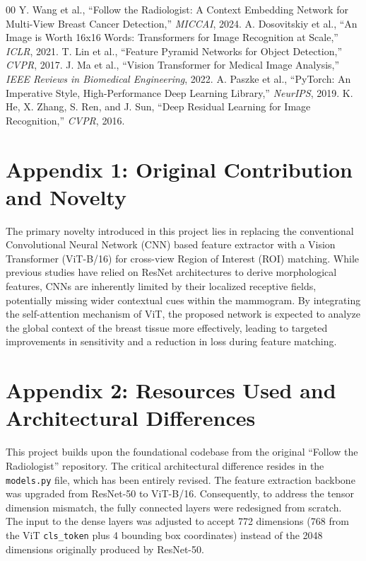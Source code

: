 \documentclass[conference]{IEEEtran}
\begin{document}
\begin{thebibliography}{00}
 Y. Wang et al., ``Follow the Radiologist: A Context Embedding Network for Multi-View Breast Cancer Detection,'' \textit{MICCAI}, 2024.
 A. Dosovitskiy et al., ``An Image is Worth 16x16 Words: Transformers for Image Recognition at Scale,'' \textit{ICLR}, 2021.
 T. Lin et al., ``Feature Pyramid Networks for Object Detection,'' \textit{CVPR}, 2017.
 J. Ma et al., ``Vision Transformer for Medical Image Analysis,'' \textit{IEEE Reviews in Biomedical Engineering}, 2022.
 A. Paszke et al., ``PyTorch: An Imperative Style, High-Performance Deep Learning Library,'' \textit{NeurIPS}, 2019.
 K. He, X. Zhang, S. Ren, and J. Sun, ``Deep Residual Learning for Image Recognition,'' \textit{CVPR}, 2016.
\end{thebibliography}

\section*{Appendix 1: Original Contribution and Novelty}
The primary novelty introduced in this project lies in replacing the conventional Convolutional Neural Network (CNN) based feature extractor with a Vision Transformer (ViT-B/16) for cross-view Region of Interest (ROI) matching. While previous studies have relied on ResNet architectures to derive morphological features, CNNs are inherently limited by their localized receptive fields, potentially missing wider contextual cues within the mammogram. By integrating the self-attention mechanism of ViT, the proposed network is expected to analyze the global context of the breast tissue more effectively, leading to targeted improvements in sensitivity and a reduction in loss during feature matching.

\section*{Appendix 2: Resources Used and Architectural Differences}
This project builds upon the foundational codebase from the original ``Follow the Radiologist'' repository. The critical architectural difference resides in the \texttt{models.py} file, which has been entirely revised. The feature extraction backbone was upgraded from ResNet-50 to ViT-B/16. Consequently, to address the tensor dimension mismatch, the fully connected layers were redesigned from scratch. The input to the dense layers was adjusted to accept 772 dimensions (768 from the ViT \texttt{cls\_token} plus 4 bounding box coordinates) instead of the 2048 dimensions originally produced by ResNet-50.
\end{document}
